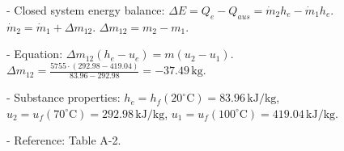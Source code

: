 - Closed system energy balance:  
  \( \Delta E = Q_{e} - Q_{aus} = \dot{m}_2 h_e - \dot{m}_1 h_e \).  
  \( \dot{m}_2 = \dot{m}_1 + \Delta m_{12} \).  
  \( \Delta m_{12} = m_2 - m_1 \).  

- Equation:  
  \( \Delta m_{12}(h_e - u_e) = m(u_2 - u_1) \).  
  \( \Delta m_{12} = \frac{5755 \cdot (292.98 - 419.04)}{83.96 - 292.98} = -37.49 \, \text{kg} \).  

- Substance properties:  
  \( h_e = h_f(20^\circ \text{C}) = 83.96 \, \text{kJ/kg} \),  
  \( u_2 = u_f(70^\circ \text{C}) = 292.98 \, \text{kJ/kg} \),  
  \( u_1 = u_f(100^\circ \text{C}) = 419.04 \, \text{kJ/kg} \).  

- Reference: Table A-2.